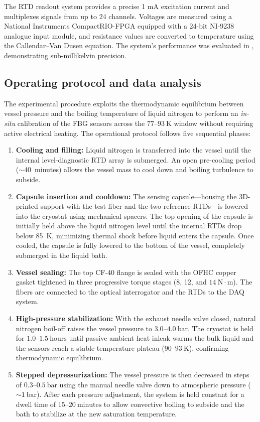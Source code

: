 \documentclass[preprint,11pt]{elsarticle}
\begin{document}
The RTD readout system provides a precise 1 mA excitation current and multiplexes signals from up to 24 channels. Voltages are measured using a National Instruments CompactRIO-FPGA equipped with a 24-bit NI-9238 analogue input module, and resistance values are converted to temperature using the Callendar–Van Dusen equation. The system's performance was evaluated in \cite{RTDs_paper}, demonstrating sub-millikelvin precision.

\subsection{Operating protocol and data analysis}
\label{subsec:protocol_analysis}

The experimental procedure exploits the thermodynamic equilibrium between vessel pressure and the boiling temperature of liquid nitrogen to perform an \textit{in-situ} calibration of the FBG sensors across the $77$--$93~\text{K}$ window without requiring active electrical heating. The operational protocol follows five sequential phases:

\begin{enumerate}
    \item \textbf{Cooling and filling:} Liquid nitrogen is transferred into the vessel until the internal level-diagnostic RTD array is submerged. An open pre-cooling period ($\sim$40~minutes) allows the vessel mass to cool down and boiling turbulence to subside.
    \item \textbf{Capsule insertion and cooldown:} The sensing capsule---housing the 3D-printed support with the test fiber and the two reference RTDs---is lowered into the cryostat using mechanical spacers. The top opening of the capsule is initially held above the liquid nitrogen level until the internal RTDs drop below 85~K, minimizing thermal shock before liquid enters the capsule. Once cooled, the capsule is fully lowered to the bottom of the vessel, completely submerged in the liquid bath.
    \item \textbf{Vessel sealing:} The top CF-40 flange is sealed with the OFHC copper gasket tightened in three progressive torque stages (8, 12, and $14~\text{N}\cdot\text{m}$). The fibers are connected to the optical interrogator and the RTDs to the DAQ system.
    \item \textbf{High-pressure stabilization:} With the exhaust needle valve closed, natural nitrogen boil-off raises the vessel pressure to $3.0$--$4.0~\text{bar}$. The cryostat is held for $1.0$--$1.5~\text{hours}$ until passive ambient heat inleak warms the bulk liquid and the sensors reach a stable temperature plateau ($90$--$93~\text{K}$), confirming thermodynamic equilibrium.
    \item \textbf{Stepped depressurization:} The vessel pressure is then decreased in steps of $0.3$--$0.5~\text{bar}$ using the manual needle valve down to atmospheric pressure ($\sim 1~\text{bar}$). After each pressure adjustment, the system is held constant for a dwell time of $15$--$20~\text{minutes}$ to allow convective boiling to subside and the bath to stabilize at the new saturation temperature.
\end{enumerate}
\end{document}
